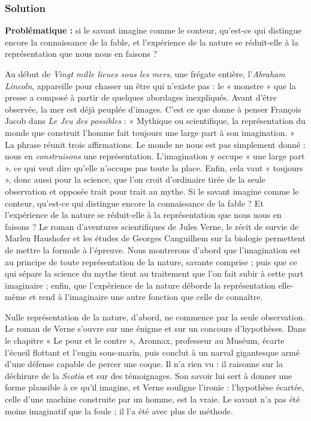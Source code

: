 \documentclass[11pt,a4paper]{article}
\begin{document}
\hypertarget{solution-9}{%
\subsubsection{Solution}\label{solution-9}}

\textbf{Problématique :} si le savant imagine comme le conteur, qu'est-ce qui distingue encore la connaissance de la fable, et l'expérience de la nature se réduit-elle à la représentation que nous nous en faisons ?

Au début de \emph{Vingt mille lieues sous les mers}, une frégate entière, l'\emph{Abraham Lincoln}, appareille pour chasser un être qui n'existe pas : le « monstre » que la presse a composé à partir de quelques abordages inexpliqués. Avant d'être observée, la mer est déjà peuplée d'images. C'est ce que donne à penser François Jacob dans \emph{Le Jeu des possibles} : « Mythique ou scientifique, la représentation du monde que construit l'homme fait toujours une large part à son imagination. » La phrase réunit trois affirmations. Le monde ne nous est pas simplement donné : nous en \emph{construisons} une représentation. L'imagination y occupe « une large part », ce qui veut dire qu'elle n'occupe pas toute la place. Enfin, cela vaut « toujours », donc aussi pour la science, que l'on croit d'ordinaire tirée de la seule observation et opposée trait pour trait au mythe. Si le savant imagine comme le conteur, qu'est-ce qui distingue encore la connaissance de la fable ? Et l'expérience de la nature se réduit-elle à la représentation que nous nous en faisons ? Le roman d'aventures scientifiques de Jules Verne, le récit de survie de Marlen Haushofer et les études de Georges Canguilhem sur la biologie permettent de mettre la formule à l'épreuve. Nous montrerons d'abord que l'imagination est au principe de toute représentation de la nature, savante comprise ; puis que ce qui sépare la science du mythe tient au traitement que l'on fait subir à cette part imaginaire ; enfin, que l'expérience de la nature déborde la représentation elle-même et rend à l'imaginaire une autre fonction que celle de connaître.

Nulle représentation de la nature, d'abord, ne commence par la seule observation. Le roman de Verne s'ouvre sur une énigme et sur un concours d'hypothèses. Dans le chapitre « Le pour et le contre », Aronnax, professeur au Muséum, écarte l'écueil flottant et l'engin sous-marin, puis conclut à un narval gigantesque armé d'une défense capable de percer une coque. Il n'a rien vu : il raisonne sur la déchirure de la \emph{Scotia} et sur des témoignages. Son savoir lui sert à donner une forme plausible à ce qu'il imagine, et Verne souligne l'ironie : l'hypothèse écartée, celle d'une machine construite par un homme, est la vraie. Le savant n'a pas été moins imaginatif que la foule ; il l'a été avec plus de méthode.
\end{document}
